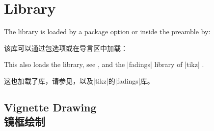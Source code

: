 \section{Library }\label{sec:vignette}%
%
The library is loaded by a package option or inside the preamble by:

该库可以通过包选项或在导言区中加载：
\begin{dispListing}
\end{dispListing}
This also loads the  library, see ,
and the |fadings| library of |tikz| .

这也加载了库，请参见，以及|tikz|的|fadings|库。
\subsection{Vignette Drawing\\镜框绘制}\label{subsec:vignettedrawing}

